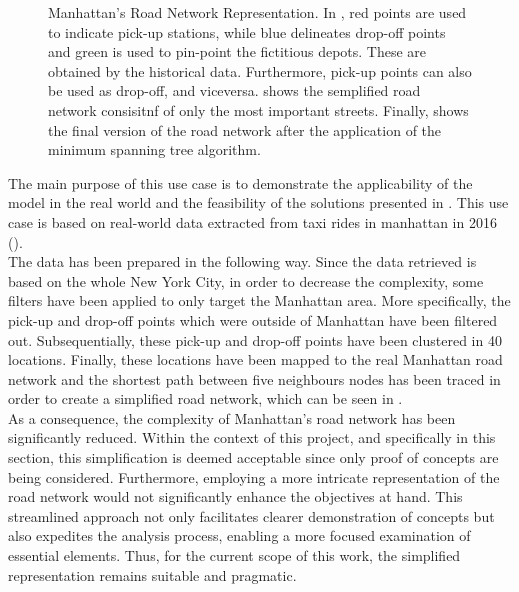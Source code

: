 \begin{figure}[tbh]
	\caption[Manhattan's Road Network Representation]{Manhattan's Road Network Representation. In , red points are used to indicate pick-up stations, while blue delineates drop-off points and green is used to pin-point the fictitious depots. These are obtained by the historical data. Furthermore, pick-up points can also be used as drop-off, and viceversa.  shows the semplified road network consisitnf of only the most important streets. Finally,  shows the final version of the road network after the application of the minimum spanning tree algorithm.  }
	\label{fig:nyc_rn}
\end{figure}
The main purpose of this use case is to demonstrate the applicability of the model in the real world and the feasibility of the solutions presented in . This use case is based on real-world data extracted from taxi rides in manhattan in 2016 (\cite{Donovan2014}). \\
The data has been prepared in the following way. Since the data retrieved is based on the whole New York City, in order to decrease the complexity, some filters have been applied to only target the Manhattan area. More specifically, the pick-up and drop-off points which were outside of Manhattan have been filtered out. Subsequentially, these pick-up and drop-off points have been clustered in 40 locations. Finally, these locations have been mapped to the real Manhattan road network and the shortest path between five neighbours nodes has been traced in order to create a simplified road network, which can be seen in . \\
As a consequence, the complexity of Manhattan's road network has been significantly reduced. Within the context of this project, and specifically in this section, this simplification is deemed acceptable since only proof of concepts are being considered. Furthermore, employing a more intricate representation of the road network would not significantly enhance the objectives at hand. This streamlined approach not only facilitates clearer demonstration of concepts but also expedites the analysis process, enabling a more focused examination of essential elements. Thus, for the current scope of this work, the simplified representation remains suitable and pragmatic.
